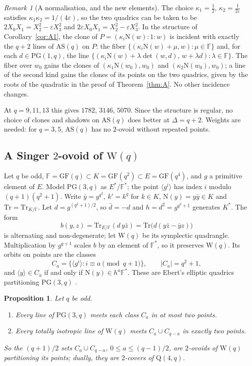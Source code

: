 \documentclass[11pt]{amsart}
\newtheorem{proposition}[theorem]{Proposition}
\theoremstyle{definition}
\theoremstyle{remark}
\newtheorem{remark}[theorem]{Remark}
\newcommand{\PG}{\mathrm{PG}}
\newcommand{\GF}{\mathrm{GF}}
\newcommand{\F}{\mathbb{F}}
\newcommand{\AS}{\mathrm{AS}}
\newcommand{\Wq}{\mathrm{W}}
\newcommand{\Qf}{\mathrm{Q}}
\newcommand{\Tr}{\mathrm{Tr}}
\newcommand{\Nm}{\mathrm{N}}
\begin{document}
\begin{remark}[A normalisation, and the new elements]\label{rem:Acoords}
The choice $\kappa_1=\tfrac12$, $\kappa_2=\tfrac1{2\varepsilon}$ satisfies $\kappa_1\kappa_2=1/(4\varepsilon)$, so the two quadrics can be taken to be $2X_0X_1=X_2^2-\varepsilon X_3^2$ and $2\varepsilon X_0X_1=X_2^2-\varepsilon X_3^2$. In the structure of Corollary~\ref{cor:A1}, the clone of $P=(\kappa_i\Nm(w){:}1{:}w)$ is incident with exactly the $q+2$ lines of $\AS(q)$ on $P$: the fiber $\{(\kappa_i\Nm(w)+\mu,w):\mu\in\F\}$ and, for each $d\in\PG(1,q)$, the line $\{(\kappa_i\Nm(w)+\lambda\det(w,d),\,w+\lambda d):\lambda\in\F\}$. The fiber over $w_0$ gains the clones of $(\kappa_1\Nm(w_0),w_0)$ and $(\kappa_2\Nm(w_0),w_0)$; a line of the second kind gains the clones of its points on the two quadrics, given by the roots of the quadratic in the proof of Theorem~\ref{thm:A}. No other incidence changes.
\end{remark}

At $q=9,11,13$ this gives $1782$, $3146$, $5070$. Since the structure is regular, no choice of clones and shadows on $\AS(q)$ does better at $\Delta=q+2$. Weights are needed: for $q=3,5$, $\AS(q)$ has no $2$-ovoid without repeated points.

\subsection{A Singer \texorpdfstring{$2$}{2}-ovoid of \texorpdfstring{$\Wq(q)$}{W(q)}}
Let $q$ be odd, $\F=\GF(q)\subset K=\GF(q^2)\subset E=\GF(q^4)$, and $g$ a primitive element of $E$. Model $\PG(3,q)$ as $E^*/\F^*$; the point $\langle g^i\rangle$ has index $i$ modulo $(q+1)(q^2+1)$. Write $\bar y=y^{q^2}$, $k'=k^q$ for $k\in K$, $\Nm(y)=y\bar y\in K$ and $\Tr=\Tr_{K/\F}$. Let $d=g^{(q^2+1)/2}$, so $\bar d=-d$ and $h=d^2=g^{q^2+1}$ generates $K^*$. The form
\[
b(y,z)=\Tr_{E/\F}(d\,y\bar z)=\Tr\bigl(d(y\bar z-\bar yz)\bigr)
\]
is alternating and non-degenerate; let $\Wq(q)$ be its symplectic quadrangle. Multiplication by $g^{q+1}$ scales $b$ by an element of $\F^*$, so it preserves $\Wq(q)$. Its orbits on points are the classes
\[
C_a=\{\langle g^i\rangle: i\equiv a\pmod{q+1}\},\qquad |C_a|=q^2+1,
\]
and $\langle y\rangle\in C_a$ if and only if $\Nm(y)\in h^a\F^*$. These are Ebert's elliptic quadrics partitioning $\PG(3,q)$ \cite{E85}.

\begin{proposition}\label{prop:C}
Let $q$ be odd.
\begin{enumerate}[label=\textup{(\alph*)}]
\item Every line of $\PG(3,q)$ meets each class $C_a$ in at most two points.
\item Every totally isotropic line of $\Wq(q)$ meets $C_a\cup C_{q-a}$ in exactly two points.
\end{enumerate}
So the $(q+1)/2$ sets $C_a\cup C_{q-a}$, $0\le a\le(q-1)/2$, are $2$-ovoids of $\Wq(q)$ partitioning its points; dually, they are $2$-covers of $\Qf(4,q)$.
\end{proposition}
\end{document}
